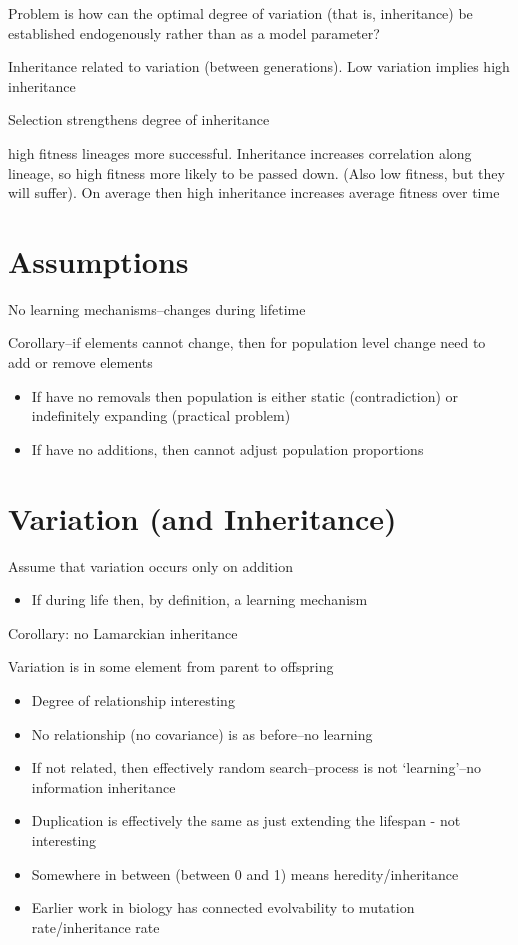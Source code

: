 Problem is how can the optimal degree of variation (that is, inheritance) be established endogenously rather than as a model parameter?

Inheritance related to variation (between generations). Low variation implies high inheritance

Selection strengthens degree of inheritance

high fitness lineages more successful. Inheritance increases
correlation along lineage, so high fitness more likely to be passed
down. (Also low fitness, but they will suffer). On average then high
inheritance increases average fitness over time

\section{Assumptions}\label{assumptions}

No learning mechanisms--changes during lifetime

Corollary--if elements cannot change, then for population level change need to add or remove elements

\begin{itemize}
	\item
 If have no removals then population is either static (contradiction)
 or indefinitely expanding (practical problem)
	\item
 If have no additions, then cannot adjust population proportions
\end{itemize}

\section{Variation (and Inheritance)}\label{variation-and-inheritance}

Assume that variation occurs only on addition

\begin{itemize}
	\item
 If during life then, by definition, a learning mechanism
\end{itemize}

Corollary: no Lamarckian inheritance

Variation is in some element from parent to offspring

\begin{itemize}
	\item
 Degree of relationship interesting
	\item
 No relationship (no covariance) is as before--no learning
	\item
 If not related, then effectively random search--process is not
 `learning'--no information inheritance
	\item
 Duplication is effectively the same as just extending the lifespan -
 not interesting
	\item
 Somewhere in between (between 0 and 1) means heredity/inheritance
	\item
 Earlier work in biology has connected evolvability to mutation
 rate/inheritance rate
\end{itemize}


